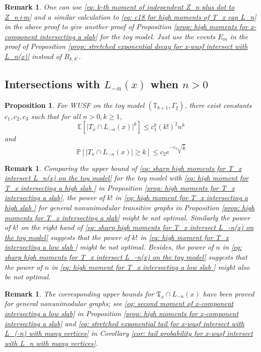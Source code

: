\documentclass[12pt]{article}
\newtheorem{proposition}[theorem]{Proposition}
\newtheorem{remark}[theorem]{Remark}
\numberwithin{equation}{section}
\newcommand{\be}{\begin{equation}}
\newcommand{\ee}{\end{equation}}
\newcommand{\1}{\mathbf{1}}
\begin{document}
\begin{remark}
	One can use \eqref{eq: k-th moment of independent Z_n plus dot to Z_n+m} and a similar calculation to \eqref{eq: c18 for high moments of T_x cap L_n} in the above proof to give another proof of Proposition \ref{prop: high moments for x-component intersecting a slab} for the toy model. Just use the events $E_m$ in the proof of Proposition \ref{prop: stretched exponential decay for x-wusf intersect with L_n(x)} instead of $B_{k,k'}$. 
\end{remark}



\subsection{Intersections with $L_{-n}(x)$ when $n>0$}


\begin{proposition}\label{prop: sharp high moments for T_x intersect L_-n(x) on the toy model}
		For WUSF on the toy model $(\mathbb{T}_{b+1},\Gamma_{\xi})$, there exist constants $c_1,c_2,c_3$ such that for all $n>0,k\geq 1$,
	\be\label{eq: sharp high moments for T_x intersect L_-n(x) on the toy model}
\mathbb{E}[|T_x\cap L_{-n}(x)|^k]\leq c_1^k(k!)^2n^k
	\ee
	and
	\be\label{eq: stretched exponential decay for T_x intersecting with L_-n(x)}
	\mathbb{P}[|T_x\cap L_{-n}(x)|\geq k]\leq c_2e^{-c_3\sqrt{\frac{k}{n}}}
	\ee
\end{proposition}
\begin{remark}
	Comparing the upper bound of  \eqref{eq: sharp high moments for T_x intersect L_n(x) on the toy model}  for the toy model with \eqref{eq: high moment for T_x intersecting a high slab } in  Proposition \ref{prop: high moments for T_x intersecting a slab}, the power of $k!$ in \eqref{eq: high moment for T_x intersecting a high slab } for general nonunimodular transitive graphs  in  Proposition \ref{prop: high moments for T_x intersecting a slab} might be not optimal.  Similarly the power of $k!$  on the right hand of  \eqref{eq: sharp high moments for T_x intersect L_-n(x) on the toy model} suggests that the power of $k!$ in \eqref{eq: high moment for T_x intersecting a low slab } might be not optimal. Besides, the power of $n$ in   \eqref{eq: sharp high moments for T_x intersect L_-n(x) on the toy model} suggests that the power of $n$ in \eqref{eq: high moment for T_x intersecting a low slab }  might also be not optimal.
\end{remark}
\begin{remark}
	The corresponding upper bounds for $\mathfrak{T}_x\cap L_{-n}(x)$ have been proved for general nonunimodular graphs; see  \eqref{eq: second moment of x-component intersecting a low slab} in Proposition \ref{prop: high moments for x-component intersecting a slab} and \eqref{eq: stretched exponential tail for x-wusf intersect with L_(-n) with many vertices} in  Corollary \ref{cor: tail probability for x-wusf intersect with L_n with many vertices}. 
\end{remark}
\end{document}
